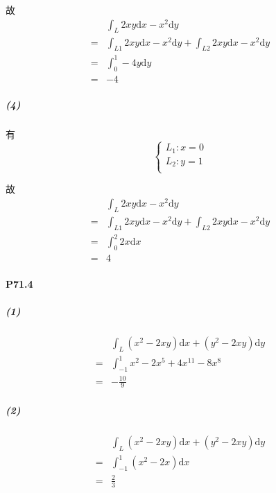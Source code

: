 \documentclass[UTF8]{ctexart}
\begin{document}
    故
    \begin{align*}
        &\int_{L} 2xy \mathrm{d}x - x^2 \mathrm{d}y \\
        =& \int_{L1} 2xy \mathrm{d}x - x^2 \mathrm{d}y + \int_{L2} 2xy \mathrm{d}x - x^2 \mathrm{d}y \\
        =& \int_{0}^{1} -4y \mathrm{d}y \\
        =& -4
    \end{align*}

    \subparagraph*{(4)}
    有
    \begin{equation}
        \begin{cases}
            L_1:x=0 \\
            L_2:y=1 \\
        \end{cases}
    \end{equation}

    故
    \begin{align*}
        &\int_{L} 2xy \mathrm{d}x - x^2 \mathrm{d}y \\
        =& \int_{L1} 2xy \mathrm{d}x - x^2 \mathrm{d}y + \int_{L2} 2xy \mathrm{d}x - x^2 \mathrm{d}y \\
        =&\int_{0}^{2} 2x \mathrm{d}x \\
        =& 4
    \end{align*}
    \paragraph*{P71.4}
    \subparagraph*{(1)}
    
    \begin{align*}
        &\int_{L}^{} (x^2-2xy) \mathrm{d}x + (y^2-2xy) \mathrm{d}y \\
        =& \int_{-1}^{1} x^2-2x^5+4x^{11}-8x^8 \\
        =& -\frac{10}{9} 
    \end{align*}

    \subparagraph*{(2)}
    \begin{align*}
        &\int_{L}^{} (x^2-2xy) \mathrm{d}x + (y^2-2xy) \mathrm{d}y \\
        =& \int_{-1}^{1} (x^2-2x) \mathrm{d}x \\
        =& \frac{2}{3} 
    \end{align*}
\end{document}
